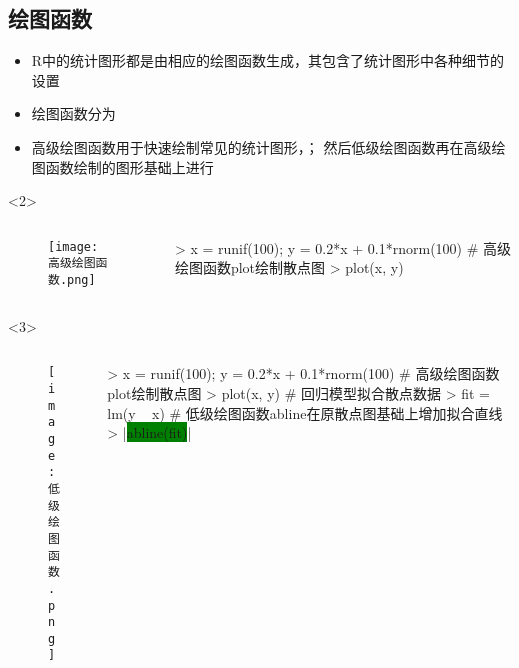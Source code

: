 \subsection{绘图函数}
\begin{frame}[t, fragile]{\subsecname}{}
\begin{itemize}
\item R中的统计图形都是由相应的绘图函数生成，其包含了统计图形中各种细节的设置
\item 绘图函数分为
\item 高级绘图函数用于快速绘制常见的统计图形，；
然后低级绘图函数再在高级绘图函数绘制的图形基础上进行
\end{itemize}

\begin{overlayarea}{\textwidth}{\textheight}
\begin{onlyenv}<2>
\begin{columns}
        \begin{column}{.4\textwidth}
          \begin{figure}
            \centering
            \texttt{[image: 高级绘图函数.png]}
          \end{figure}
        \end{column}

        \begin{column}{.6\textwidth}
 \centering
\begin{rcode}
> x = runif(100); y = 0.2*x + 0.1*rnorm(100)
# 高级绘图函数plot绘制散点图
> plot(x, y)
\end{rcode}
        \end{column}
      \end{columns}
\end{onlyenv}

\begin{onlyenv}<3>
\begin{columns}
        \begin{column}{.4\textwidth}
          \begin{figure}
            \centering
            \texttt{[image: 低级绘图函数.png]}
          \end{figure}
        \end{column}

        \begin{column}{.6\textwidth}
 \centering
\begin{rcode}
> x = runif(100); y = 0.2*x + 0.1*rnorm(100)
# 高级绘图函数plot绘制散点图
> plot(x, y)
# 回归模型拟合散点数据
> fit = lm(y ~ x)
# 低级绘图函数abline在原散点图基础上增加拟合直线
> |\colorbox{green}{abline(fit)}|
\end{rcode}
        \end{column}
      \end{columns}
\end{onlyenv}
\end{overlayarea}  
\end{frame}


